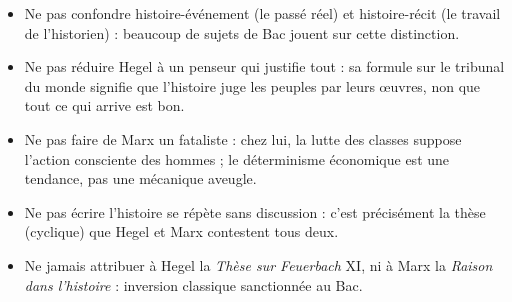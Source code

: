 \documentclass[11pt]{article}
\newcommand{\cle}[1]{{\popxbold\color{popdark}#1}}
\begin{document}
\begin{attention}
\begin{itemize}
  \item Ne pas confondre \cle{histoire-événement} (le passé réel) et \cle{histoire-récit} (le travail de l'historien) : beaucoup de sujets de Bac jouent sur cette distinction.
  \item Ne pas réduire Hegel à un penseur qui \guillemotleft justifie tout \guillemotright : sa formule sur le tribunal du monde signifie que l'histoire juge les peuples par leurs œuvres, non que tout ce qui arrive est bon.
  \item Ne pas faire de Marx un fataliste : chez lui, la lutte des classes suppose l'action consciente des hommes ; le déterminisme économique est une tendance, pas une mécanique aveugle.
  \item Ne pas écrire \guillemotleft l'histoire se répète \guillemotright sans discussion : c'est précisément la thèse (cyclique) que Hegel et Marx contestent tous deux.
  \item Ne jamais attribuer à Hegel la \emph{Thèse sur Feuerbach} XI, ni à Marx la \emph{Raison dans l'histoire} : inversion classique sanctionnée au Bac.
\end{itemize}
\end{attention}
\end{document}
